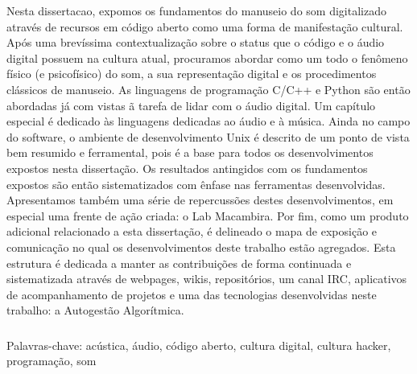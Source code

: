 \begin{resumo}

Nesta dissertacao, expomos os fundamentos do manuseio do som digitalizado através de recursos em código aberto como
uma forma de manifestação cultural.
Após uma brevíssima contextualização sobre o status que o código e o áudio digital possuem na cultura atual, procuramos abordar como um todo o fenômeno
físico (e psicofísico) do som, a sua representação digital e os procedimentos clássicos de manuseio. As linguagens de programação C/C++ e Python
são então abordadas já com vistas ã tarefa de lidar com o áudio digital. Um capítulo especial é dedicado às linguagens dedicadas ao áudio e à música. Ainda no campo do software,
o ambiente de desenvolvimento Unix é descrito de um ponto
de vista bem resumido e ferramental, pois é a base para todos os desenvolvimentos expostos nesta dissertação.
Os resultados antingidos com os fundamentos expostos são então sistematizados com ênfase nas ferramentas desenvolvidas.
Apresentamos também uma série de repercussões destes desenvolvimentos, em especial uma frente de ação criada: o Lab Macambira.
Por fim, como um produto adicional relacionado a esta dissertação, é delineado o mapa de exposição e comunicação no qual
os desenvolvimentos deste trabalho estão agregados. Esta estrutura é dedicada a manter as contribuições
de forma continuada e sistematizada através de webpages, wikis, repositórios, um canal IRC, aplicativos de acompanhamento de projetos
e uma das tecnologias desenvolvidas neste trabalho: a Autogestão Algorítmica.


$\phantom{linha em branco}$\\
Palavras-chave: acústica, áudio, código aberto, cultura digital, cultura hacker, programação, som

\end{resumo}

